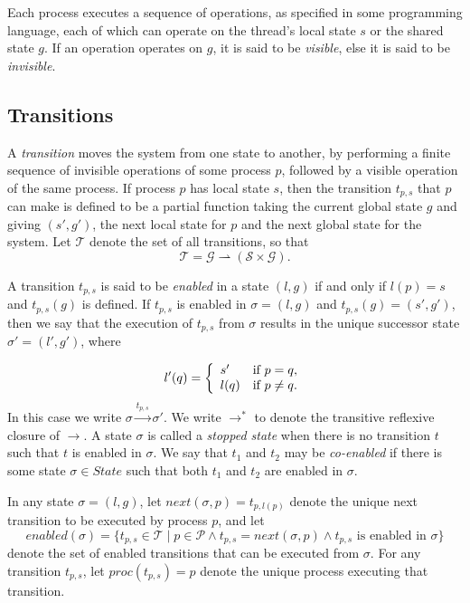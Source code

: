 \documentclass[12pt,a4paper,twoside,openright]{report}
\begin{document}
Each process executes a sequence of operations, as
specified in some programming language, each of which can
operate on the thread's local state $s$ or the shared
state $g$. If an operation
operates on $g$, it is said to be \emph{visible}, else it is said to be
\emph{invisible}.

\subsection{Transitions}
A \emph{transition} moves the system from one state to another,
by performing a finite sequence of invisible operations of some
process $p$, followed by a visible operation of the same process.
If process $p$ has local state $s$, then the transition $t_{p,s}$
that $p$ can make is defined to be a partial function taking the current
global state $g$ and giving $(s', g')$, the next local state for $p$
and the next global state for the system. Let $\mathcal{T}$ denote the
set of all transitions, so that
	\[\mathcal{T} = \mathcal{G} \rightharpoonup
				(\mathcal{S} \times \mathcal{G}).\]

A transition $t_{p,s}$ is said to be \emph{enabled} in a state
$(l, g)$ if and only if $l(p) = s$ and $t_{p,s}(g)$ is defined.
If $t_{p,s}$ is enabled in $\sigma = (l, g)$ and 
$t_{p,s}(g) = (s', g')$, then we say that the
execution of $t_{p,s}$ from $\sigma$ results in the unique successor
state $\sigma' = (l', g')$, where

\[
	l'(q) = \left\{\begin{array}{lr}
				s' & \textmd{if } p = q, \\
				l(q) &\textmd{if } p \neq q.
			\end{array} \right.
\]
In this case we write $\sigma \xrightarrow{t_{p,s}} \sigma'$.
We write $\longrightarrow^*$ to denote the transitive reflexive
closure of $\longrightarrow$.
A state $\sigma$ is called a \emph{stopped state} when there is no transition
$t$ such that $t$ is enabled in $\sigma$. We say that $t_1$ and $t_2$
may be \emph{co-enabled} if there is some state $\sigma \in \textit{State}$
such that both $t_1$ and $t_2$ are enabled in $\sigma$.

In any state $\sigma = (l, g)$, let
$\textit{next}(\sigma, p) = t_{p,l(p)}$ denote the unique next transition
to be executed by process $p$, and let
\[
	\textit{enabled}(\sigma) = \{t_{p,s} \in \mathcal{T} \mid
	p \in \mathcal{P} \wedge t_{p,s} = \textit{next}(\sigma, p)
	\wedge t_{p,s} \text{ is enabled in } \sigma\}
\]
denote the set of enabled transitions that can be executed from $\sigma$.
For any transition $t_{p,s}$, let $\textit{proc}(t_{p,s}) = p$
denote the unique process executing that transition.
\end{document}
